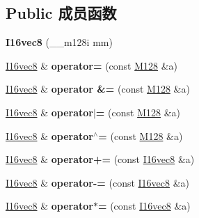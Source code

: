 \subsection*{Public 成员函数}
\begin{DoxyCompactItemize}
\item 
\mbox{\label{class_i16vec8_aae70e0e5ca2a4935ca9b6735cfdf4e41}} 
{\bfseries I16vec8} (\+\_\+\+\_\+m128i mm)
\item 
\mbox{\label{class_i16vec8_af76805eb3849565e97585fa00cd5f960}} 
\hyperlink{class_i16vec8}{I16vec8} \& {\bfseries operator=} (const \hyperlink{class_m128}{M128} \&a)
\item 
\mbox{\label{class_i16vec8_ad34c754a44e4429124664a11f2611bbb}} 
\hyperlink{class_i16vec8}{I16vec8} \& {\bfseries operator \&=} (const \hyperlink{class_m128}{M128} \&a)
\item 
\mbox{\label{class_i16vec8_ab57d704a01b7cfe42b9921434b32b2b2}} 
\hyperlink{class_i16vec8}{I16vec8} \& {\bfseries operator$\vert$=} (const \hyperlink{class_m128}{M128} \&a)
\item 
\mbox{\label{class_i16vec8_ab1ab5521b98fb3902d5d2bd52be8df58}} 
\hyperlink{class_i16vec8}{I16vec8} \& {\bfseries operator$^\wedge$=} (const \hyperlink{class_m128}{M128} \&a)
\item 
\mbox{\label{class_i16vec8_ad80d39ccf02b8aea77b17b294304b96b}} 
\hyperlink{class_i16vec8}{I16vec8} \& {\bfseries operator+=} (const \hyperlink{class_i16vec8}{I16vec8} \&a)
\item 
\mbox{\label{class_i16vec8_a9ab9fa8170b575894ba15a3f562cd6c2}} 
\hyperlink{class_i16vec8}{I16vec8} \& {\bfseries operator-\/=} (const \hyperlink{class_i16vec8}{I16vec8} \&a)
\item 
\mbox{\label{class_i16vec8_ab4910a3827fa5c5481c5e29b4c68e682}} 
\hyperlink{class_i16vec8}{I16vec8} \& {\bfseries operator$\ast$=} (const \hyperlink{class_i16vec8}{I16vec8} \&a)
\item 
\mbox{\label{class_i16vec8_a708bc99ee094ab97e058df3169ebee59}} 

\end{DoxyCompactItemize}
